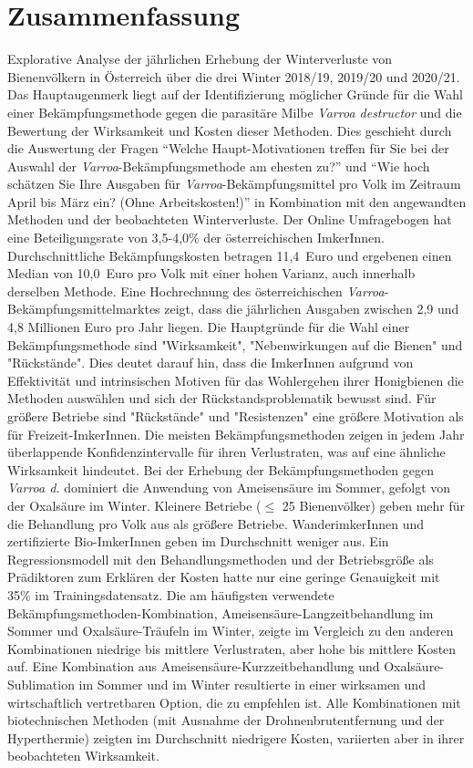 \chapter*{Zusammenfassung}
\label{sec:Zusammenfassung}
\vspace*{-15mm}

Explorative Analyse der jährlichen Erhebung der Winterverluste von Bienenvölkern in Österreich über die drei Winter 2018/19, 2019/20 und 2020/21. Das Hauptaugenmerk liegt auf der Identifizierung möglicher Gründe für die Wahl einer Bekämpfungsmethode gegen die parasitäre Milbe \textit{Varroa destructor} und die Bewertung der Wirksamkeit und Kosten dieser Methoden. Dies geschieht durch die Auswertung der Fragen \enquote{Welche Haupt-Motivationen treffen für Sie bei der Auswahl der \textit{Varroa}-Bekämpfungsmethode am ehesten zu?} und \enquote{Wie hoch schätzen Sie Ihre Ausgaben für \textit{Varroa}-Bekämpfungsmittel pro Volk im Zeitraum April bis März ein? (Ohne Arbeitskosten!)} in Kombination mit den angewandten Methoden und der beobachteten Winterverluste. Der Online Umfragebogen hat eine Beteiligungsrate von 3,5-4,0\% der österreichischen ImkerInnen. Durchschnittliche Bekämpfungskosten betragen 11,4~Euro und ergebenen einen Median von 10,0~Euro pro Volk mit einer hohen Varianz, auch innerhalb derselben Methode. Eine Hochrechnung des österreichischen \textit{Varroa}-Bekämpfungsmittelmarktes zeigt, dass die jährlichen Ausgaben zwischen 2,9 und 4,8 Millionen Euro pro Jahr liegen. Die Hauptgründe für die Wahl einer Bekämpfungsmethode sind "Wirksamkeit", "Nebenwirkungen auf die Bienen" und "Rückstände". Dies deutet darauf hin, dass die ImkerInnen aufgrund von Effektivität und intrinsischen Motiven für das Wohlergehen ihrer Honigbienen die Methoden auswählen und sich der Rückstandsproblematik bewusst sind. Für größere Betriebe sind "Rückstände" und "Resistenzen" eine größere Motivation als für Freizeit-ImkerInnen. Die meisten Bekämpfungsmethoden zeigen in jedem Jahr überlappende Konfidenzintervalle für ihren Verlustraten, was auf eine ähnliche Wirksamkeit hindeutet. Bei der Erhebung der Bekämpfungsmethoden gegen \textit{Varroa d.} dominiert die Anwendung von Ameisensäure im Sommer, gefolgt von der Oxalsäure im Winter. Kleinere Betriebe ($\leq$ 25 Bienenvölker) geben mehr für die Behandlung pro Volk aus als größere Betriebe. WanderimkerInnen und zertifizierte Bio-ImkerInnen geben im Durchschnitt weniger aus. Ein Regressionsmodell mit den Behandlungsmethoden und der Betriebsgröße als Prädiktoren zum Erklären der Kosten hatte nur eine geringe Genauigkeit mit 35\% im Trainingsdatensatz. Die am häufigsten verwendete Bekämpfungsmethoden-Kombination, Ameisensäure-Langzeitbehandlung im Sommer und Oxalsäure-Träufeln im Winter, zeigte im Vergleich zu den anderen Kombinationen niedrige bis mittlere Verlustraten, aber hohe bis mittlere Kosten auf. Eine Kombination aus Ameisensäure-Kurzzeitbehandlung und Oxalsäure-Sublimation im Sommer und im Winter resultierte in einer wirksamen und wirtschaftlich vertretbaren Option, die zu empfehlen ist. Alle Kombinationen mit biotechnischen Methoden (mit Ausnahme der Drohnenbrutentfernung und der Hyperthermie) zeigten im Durchschnitt niedrigere Kosten, variierten aber in ihrer beobachteten Wirksamkeit.
